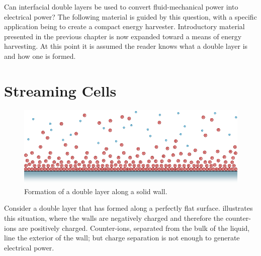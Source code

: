 
Can interfacial double layers be used to convert fluid-mechanical power into electrical power?
The following material is guided by this question, with a specific application being to create a compact energy harvester.
Introductory material presented in the previous chapter is now expanded toward a means of energy harvesting.
At this point it is assumed the reader knows what a double layer is and how one is formed.

\section{Streaming Cells}

  \begin{figure}
      \centering
      \includegraphics{content/pt1/01-PowerHarvesting/graphics/intro_2_wall}
      \caption{
        \label{fig:doubleLayerBetweenWalls}
        Formation of a double layer along a solid wall.
      }
  \end{figure}
  Consider a double layer that has formed along a perfectly flat surface.
   illustrates this situation, where the walls are negatively charged and therefore the counter-ions are positively charged.
  Counter-ions, separated from the bulk of the liquid, line the exterior of the wall; but charge separation is not enough to generate electrical power.

